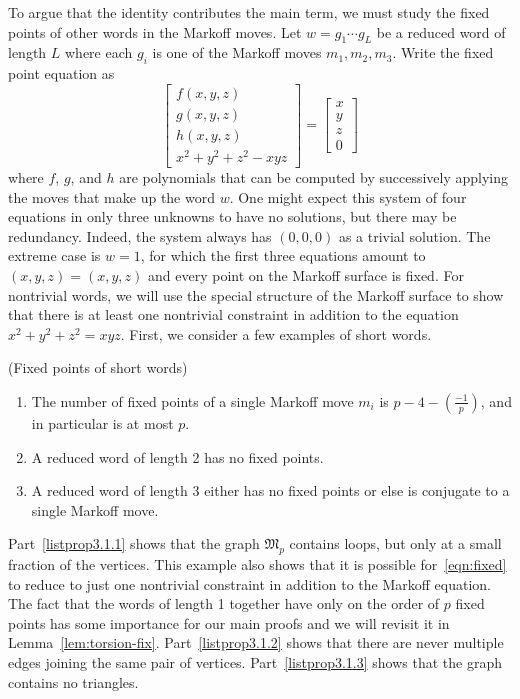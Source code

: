 \documentclass[10pt]{amsart}
\theoremstyle{definition}\newtheorem{defi}[theo]{Definition}\newtheorem{rema}[theo]{Remark}\newtheorem{exam}[theo]{Example}\newtheorem{exem}[theo]{Example}\newtheorem{nota}[theo]{Notation}
\begin{document}
To argue that the identity contributes the main term, we must study the fixed points of other words in the Markoff moves. Let $w = g_1 \cdots g_L$ be a reduced word of length $L$ where each $g_i$ is one of the Markoff moves $m_1, m_2, m_3$. Write the fixed point equation as
\begin{equation}\label{eqn:fixed}
\begin{bmatrix}
f(x,y,z) \\
g(x,y,z) \\
h(x,y,z) \\
x^2+y^2+z^2-xyz
\end{bmatrix} =
\begin{bmatrix}
x \\
y \\
z \\
0
\end{bmatrix}
\end{equation}
where $f$, $g$, and $h$ are polynomials that can be computed by successively applying the moves that make up the word $w$. One might expect this system of four equations in only three unknowns to have no solutions, but there may be redundancy. Indeed, the system always has $(0,0,0)$ as a trivial solution. The extreme case is $w=1$, for which the first three equations amount to $(x,y,z)=(x,y,z)$ and every point on the Markoff surface is fixed. For nontrivial words, we will use the special structure of the Markoff surface to show that there is at least one nontrivial constraint in addition to the equation $x^2+y^2+z^2=xyz$. First, we consider a few examples of short words.


\begin{prop}\label{prop:examples}
(Fixed points of short words)
\begin{enumerate}
\item \label{listprop3.1.1} The number of fixed points of a single Markoff move $m_i$ is $p - 4 - (\tfrac{-1}{p})$, and in particular is at most $p$.
\item \label{listprop3.1.2} A reduced word of length 2 has no fixed points.
\item \label{listprop3.1.3} A reduced word of length 3 either has no fixed points or else is conjugate to a single Markoff move.
\end{enumerate}
\end{prop}

Part~\eqref{listprop3.1.1} shows that the graph $\mathfrak{M}_p$ contains loops, but only at a small fraction of the vertices. This example also shows that it is possible for~\eqref{eqn:fixed} to reduce to just one nontrivial constraint in addition to the Markoff equation. The fact that the words of length 1 together have only on the order of $p$ fixed points has some importance for our main proofs and we will revisit it in Lemma~\ref{lem:torsion-fix}. Part~\eqref{listprop3.1.2} shows that there are never multiple edges joining the same pair of vertices. Part~\eqref{listprop3.1.3} shows that the graph contains no triangles.
\end{document}
